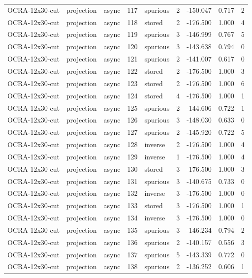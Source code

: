 \begin{tabular}{lllrlrrrr}
OCRA-12x30-cut & projection & async & 117 & spurious & 2 & -150.047 & 0.717 & 2 \\
OCRA-12x30-cut & projection & async & 118 & stored & 2 & -176.500 & 1.000 & 4 \\
OCRA-12x30-cut & projection & async & 119 & spurious & 3 & -146.999 & 0.767 & 5 \\
OCRA-12x30-cut & projection & async & 120 & spurious & 3 & -143.638 & 0.794 & 0 \\
OCRA-12x30-cut & projection & async & 121 & spurious & 2 & -141.007 & 0.617 & 0 \\
OCRA-12x30-cut & projection & async & 122 & stored & 2 & -176.500 & 1.000 & 3 \\
OCRA-12x30-cut & projection & async & 123 & stored & 2 & -176.500 & 1.000 & 6 \\
OCRA-12x30-cut & projection & async & 124 & stored & 4 & -176.500 & 1.000 & 1 \\
OCRA-12x30-cut & projection & async & 125 & spurious & 2 & -144.606 & 0.722 & 1 \\
OCRA-12x30-cut & projection & async & 126 & spurious & 3 & -148.030 & 0.633 & 0 \\
OCRA-12x30-cut & projection & async & 127 & spurious & 2 & -145.920 & 0.722 & 5 \\
OCRA-12x30-cut & projection & async & 128 & inverse & 2 & -176.500 & 1.000 & 4 \\
OCRA-12x30-cut & projection & async & 129 & inverse & 1 & -176.500 & 1.000 & 4 \\
OCRA-12x30-cut & projection & async & 130 & stored & 3 & -176.500 & 1.000 & 3 \\
OCRA-12x30-cut & projection & async & 131 & spurious & 3 & -140.675 & 0.733 & 0 \\
OCRA-12x30-cut & projection & async & 132 & inverse & 3 & -176.500 & 1.000 & 0 \\
OCRA-12x30-cut & projection & async & 133 & stored & 3 & -176.500 & 1.000 & 1 \\
OCRA-12x30-cut & projection & async & 134 & inverse & 3 & -176.500 & 1.000 & 0 \\
OCRA-12x30-cut & projection & async & 135 & spurious & 3 & -146.234 & 0.794 & 2 \\
OCRA-12x30-cut & projection & async & 136 & spurious & 2 & -140.157 & 0.556 & 3 \\
OCRA-12x30-cut & projection & async & 137 & spurious & 5 & -143.339 & 0.772 & 0 \\
OCRA-12x30-cut & projection & async & 138 & spurious & 2 & -136.252 & 0.606 & 1 \\

\end{tabular}
